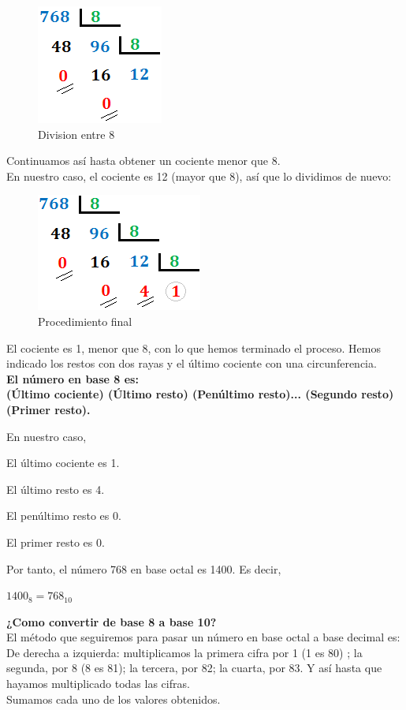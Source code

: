 \documentclass{article}
\begin{document}
\begin{multicols}{2}
\begin{figure}[H]	
\centering
\includegraphics[scale=1]{Octal-2.png}
\caption{Division entre 8}
	\end{figure}

Continuamos así hasta obtener un cociente menor que 8.
\\
En nuestro caso, el cociente es 12 (mayor que 8), así que lo dividimos de nuevo:
\begin{figure}[H]	
\centering
\includegraphics[scale=1]{Octal-3.png}
\caption{Procedimiento final}
	\end{figure}
El cociente es 1, menor que 8, con lo que hemos terminado el proceso. Hemos indicado los restos con dos rayas y el último cociente con una circunferencia.
\\
\textbf{El número en base 8 es:
\\
(Último cociente) (Último resto) (Penúltimo resto)... (Segundo resto) (Primer resto).}

En nuestro caso,

El último cociente es 1.

El último resto es 4.

El penúltimo resto es 0.

El primer resto es 0.

Por tanto, el número 768 en base octal es 1400. Es decir,
\begin{center}
$1400_{8}=768_{10}$
\end{center}
\textbf{¿Como convertir de base 8 a base 10?}
\\
El método que seguiremos para pasar un número en base octal a base decimal es:
\\
De derecha a izquierda: multiplicamos la primera cifra por 1 (1 es 80) ; la segunda, por 8 (8 es 81); la tercera, por 82; la cuarta, por 83. Y así hasta que hayamos multiplicado todas las cifras.
\\
Sumamos cada uno de los valores obtenidos.


\end{multicols}
\end{document}
